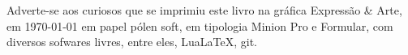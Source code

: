 \pagebreak
\thispagestyle{empty}

\ifodd\thepage\blankpage\fi

\mbox{}\vfill

\begin{center}
		\begin{minipage}{.7\textwidth}\tiny\noindent{}
		\centering\tiny
		Adverte-se aos curiosos que se imprimiu este 
		livro na gráfica Expressão \& Arte, 
		em \today{} em papel pólen soft, em tipologia Minion Pro e Formular, 
		com diversos sofwares livres, 
		entre eles, Lua\LaTeX, git.\\ 
		\medskip\\\
		\end{minipage}
\end{center}